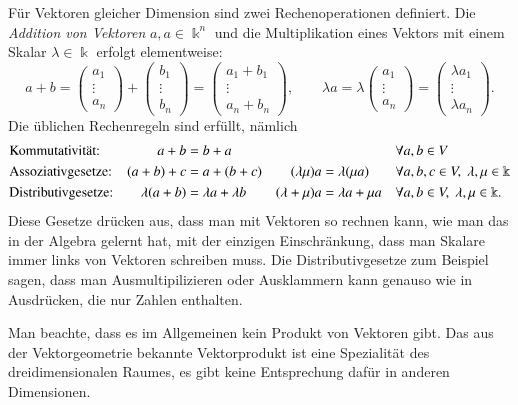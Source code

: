 Für Vektoren gleicher Dimension sind zwei Rechenoperationen definiert.
Die {\em Addition von Vektoren} $a,a\in\Bbbk^n$  und die Multiplikation
%
eines Vektors mit einem Skalar $\lambda\in\Bbbk$ erfolgt elementweise:
\[
a+b
=
\begin{pmatrix}a_1\\\vdots\\a_n\end{pmatrix}
+
\begin{pmatrix}b_1\\\vdots\\b_n\end{pmatrix}
=
\begin{pmatrix}a_1+b_1\\\vdots\\a_n+b_n\end{pmatrix},
\qquad
\lambda a
=
\lambda
\begin{pmatrix}a_1\\\vdots\\a_n\end{pmatrix}
=
\begin{pmatrix}\lambda a_1\\\vdots\\\lambda a_n\end{pmatrix}.
\]
Die üblichen Rechenregeln sind erfüllt, nämlich
\begin{equation}
\index{Kommutativgesetz}%
\index{Assoziativgesetz}%
\index{Distributivgesetz}%
\begin{aligned}
&\text{Kommutativität:}
&
a+b&=b+a
&&
&&\forall a,b\in V
\\
&\text{Assoziativgesetze:}
&
(a+b)+c&=a+(b+c)
&
(\lambda\mu)a&=\lambda(\mu a)
&&\forall a,b,c\in V,\; \lambda,\mu\in\Bbbk
\\
&\text{Distributivgesetze:}
&
\lambda(a+b)&=\lambda a + \lambda b
&
(\lambda+\mu)a&=\lambda a + \mu a
&&\forall a,b\in V,\; \lambda,\mu\in\Bbbk.
\\
\end{aligned}
\label{buch:vektoren-und-matrizen:eqn:vrgesetze}
\end{equation}
Diese Gesetze drücken aus, dass man mit Vektoren so rechnen kann, wie man
das in der Algebra gelernt hat, mit der einzigen Einschränkung, dass
man Skalare immer links von Vektoren schreiben muss.
Die Distributivgesetze zum Beispiel sagen, dass man Ausmultipilizieren
oder Ausklammern kann genauso wie in Ausdrücken, die nur Zahlen enthalten.

Man beachte, dass es im Allgemeinen kein Produkt von Vektoren gibt.
Das aus der Vektorgeometrie bekannte Vektorprodukt ist eine Spezialität
des dreidimensionalen Raumes, es gibt keine Entsprechung dafür in anderen
Dimensionen.

